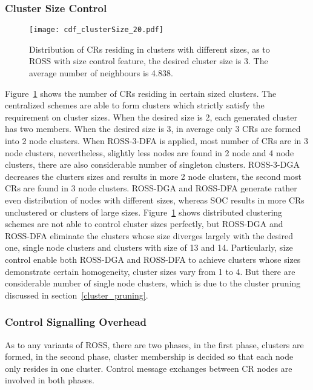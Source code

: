 

\subsubsection*{Cluster Size Control}
\label{cluster_size}
\begin{figure}[ht!]
  \centering
  \texttt{[image: cdf\_clusterSize\_20.pdf]}
  \caption{Distribution of CRs residing in clusters with different sizes, as to ROSS with size control feature, the desired cluster size is 3. The average number of neighbours is 4.838.}
  \label{size_control}
\end{figure}
Figure~\ref{size_control} shows the number of CRs residing in certain sized clusters.
The centralized schemes are able to form clusters which strictly satisfy the requirement on cluster sizes.
When the desired size is 2, each generated cluster has two members.
When the desired size is 3, in average only 3 CRs are formed into 2 node clusters.
When ROSS-3-DFA is applied, most number of CRs are in 3 node clusters, nevertheless, slightly less nodes are found in 2 node and 4 node clusters, there are also considerable number of singleton clusters.
ROSS-3-DGA decreases the clusters sizes and results in more 2 node clusters, the second most CRs are found in 3 node clusters.
ROSS-DGA and ROSS-DFA generate rather even distribution of nodes with different sizes, whereas SOC results in more CRs unclustered or clusters of large sizes. 
Figure~\ref{size_control} shows distributed clustering schemes are not able to control cluster sizes perfectly, but ROSS-DGA and ROSS-DFA eliminate the clusters whose size diverges largely with the desired one, \ie single node clusters and clusters with size of 13 and 14.
Particularly, size control enable both ROSS-DGA and ROSS-DFA to achieve clusters whose sizes demonstrate certain homogeneity, \ie cluster sizes vary from 1 to 4.
But there are considerable number of single node clusters, which is due to the cluster pruning discussed in section~\ref{cluster_pruning}.

\subsubsection*{Control Signalling Overhead}
As to any variants of ROSS, there are two phases, in the first phase, clusters are formed, in the second phase, cluster membership is decided so that each node only resides in one cluster.
Control message exchanges between CR nodes are involved in both phases.

